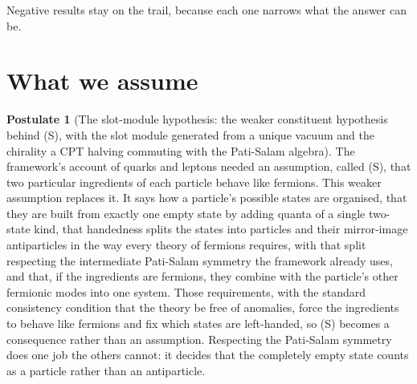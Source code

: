 \documentclass[11pt]{article}
\theoremstyle{definition}
\newtheorem{postulate}[theorem]{Postulate}
\theoremstyle{plain}
\begin{document}
Negative results stay on the trail, because each one narrows what the answer can be.

\section{What we assume}

\begin{postulate}[The slot-module hypothesis: the weaker constituent hypothesis behind (S), with the slot module generated from a unique vacuum and the chirality a CPT halving commuting with the Pati-Salam algebra]\label{c:standard-model.slot-module-hypothesis}
The framework's account of quarks and leptons needed an assumption, called (S), that two particular ingredients of each particle behave like fermions. This weaker assumption replaces it. It says how a particle's possible states are organised, that they are built from exactly one empty state by adding quanta of a single two-state kind, that handedness splits the states into particles and their mirror-image antiparticles in the way every theory of fermions requires, with that split respecting the intermediate Pati-Salam symmetry the framework already uses, and that, if the ingredients are fermions, they combine with the particle's other fermionic modes into one system. Those requirements, with the standard consistency condition that the theory be free of anomalies, force the ingredients to behave like fermions and fix which states are left-handed, so (S) becomes a consequence rather than an assumption. Respecting the Pati-Salam symmetry does one job the others cannot: it decides that the completely empty state counts as a particle rather than an antiparticle.
\end{postulate}
\end{document}
